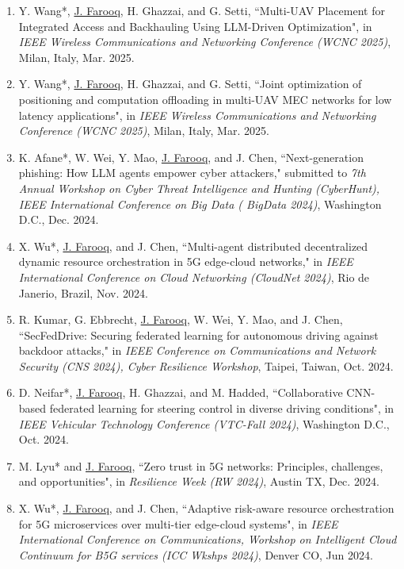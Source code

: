 \documentclass[letterpaper,11pt]{article}
\begin{document}
\begin{enumerate}
      \item[\rm{[C26]}] Y. Wang*, \underline{J. Farooq}, H. Ghazzai, and G. Setti, ``Multi-UAV Placement for Integrated Access and Backhauling Using LLM-Driven Optimization", in \textit{IEEE Wireless Communications and Networking Conference (WCNC 2025)}, Milan, Italy, Mar. 2025.
      \item[\rm{[C25]}] Y. Wang*, \underline{J. Farooq}, H. Ghazzai, and G. Setti, ``Joint optimization of positioning and computation offloading in multi-UAV MEC networks for low latency applications", in \textit{IEEE Wireless Communications and Networking Conference (WCNC 2025)}, Milan, Italy, Mar. 2025.
      \item[\rm{[C24]}] K. Afane*, W. Wei, Y. Mao, \underline{J. Farooq}, and J. Chen, ``Next-generation phishing: How LLM agents empower cyber attackers," submitted to \textit{7th Annual Workshop on Cyber Threat Intelligence and Hunting (CyberHunt), IEEE International Conference on Big Data ( BigData 2024)}, Washington D.C., Dec. 2024.
      \item[\rm{[C23]}] X. Wu*, \underline{J. Farooq}, and J. Chen, ``Multi-agent distributed decentralized dynamic resource orchestration in 5G edge-cloud networks," in \textit{IEEE International Conference on Cloud Networking (CloudNet 2024)}, Rio de Janerio, Brazil, Nov. 2024.
      \item[\rm{[C22]}] R. Kumar, G. Ebbrecht, \underline{J. Farooq}, W. Wei, Y. Mao, and J. Chen, ``SecFedDrive: Securing federated learning for autonomous driving against backdoor attacks," in \textit{IEEE Conference on Communications and Network Security (CNS 2024), Cyber Resilience Workshop}, Taipei, Taiwan, Oct. 2024.
      \item[\rm{[C21]}] D. Neifar*, \underline{J. Farooq}, H. Ghazzai, and M. Hadded, ``Collaborative CNN-based federated learning for steering control in diverse driving conditions", in \textit{IEEE Vehicular Technology Conference (VTC-Fall 2024)}, Washington D.C., Oct. 2024.
      \item[\rm{[C20]}] M. Lyu* and \underline{J. Farooq}, ``Zero trust in 5G networks: Principles, challenges, and opportunities", in \textit{Resilience Week (RW 2024)}, Austin TX, Dec. 2024.
      \item[\rm{[C19]}] X. Wu*, \underline{J. Farooq}, and J. Chen, ``Adaptive risk-aware resource orchestration for 5G microservices over multi-tier edge-cloud systems", in \textit{IEEE International Conference on Communications, Workshop on Intelligent Cloud Continuum for B5G services (ICC Wkshps 2024)}, Denver CO, Jun 2024.

\end{enumerate}
\end{document}
